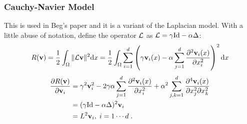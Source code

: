 \documentclass[letterpaper,12pt]{article}
\begin{document}
\subsubsection*{Cauchy-Navier Model}
\label{sec:cauchynaviermodel}

This is used in Beg's paper \cite{Beg2005Computing} and it is a
variant of the Laplacian model. With a little abuse of notation, define the operator $\mathcal{L}$ as $\mathcal{L} = \gamma \text{Id} - \alpha \Delta$:
\begin{align}
& R(\mathbf{v}) = \frac{1}{2} \int_\Omega \| \mathcal{L} \mathbf{v} \| ^2 \text{d} x
= \frac{1}{2} \int_\Omega \sum_{i=1}^d  
\left(
\gamma \mathbf{v}_i(x) - \alpha \sum_{j=1}^d  \frac{\partial^2 \mathbf{v}_i(x)}{\partial x_i^2}
\right)^2 \text{d} x
\\
\end{align}
\begin{equation}
\label{eq:dBeg}
\begin{split}
\frac{\partial R(\mathbf{v})}{\partial \mathbf{v}_i} 
& = 
\gamma^2 \mathbf{v}_i^2 - 2 \gamma \alpha \sum_{j=1}^d{\frac{\partial^2 \mathbf{v}_i(x)}{\partial x_i^2}} 
+ \alpha^2 \sum_{j,k=1}^d{\frac{\partial^4 \mathbf{v}_i(x)}{\partial x_j^2 \partial x_k^2}} 
\\
& = (\gamma \text{Id} - \alpha \Delta)^2 \mathbf{v}_i \\
& = L^2 \mathbf{v}_i
, \; i=1 \cdots d \;.
\end{split} 
\end{equation}
\end{document}

